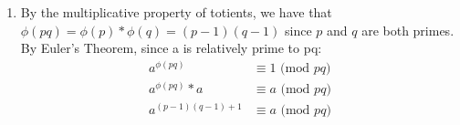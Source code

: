 \documentclass[a4paper]{article}
\newcommand{\<}{\langle}
\renewcommand{\>}{\rangle}
\renewcommand{\^}{\wedge}
\begin{document}
\begin{enumerate}
        \item
            By the multiplicative property of totients, we have that $\phi(pq) = \phi(p) * \phi(q) = (p-1)(q-1)$ since $p$ and $q$ are both primes.\\
            By Euler's Theorem, since a is relatively prime to pq:
            \begin{align*}
                a^{\phi(pq)} &\equiv 1 \text{ (mod }pq)\\
                a^{\phi(pq)} * a &\equiv a \text{ (mod }pq)\\
                a^{(p-1)(q-1) + 1} &\equiv a \text{ (mod }pq)
            \end{align*}
\end{enumerate}
\end{document}
